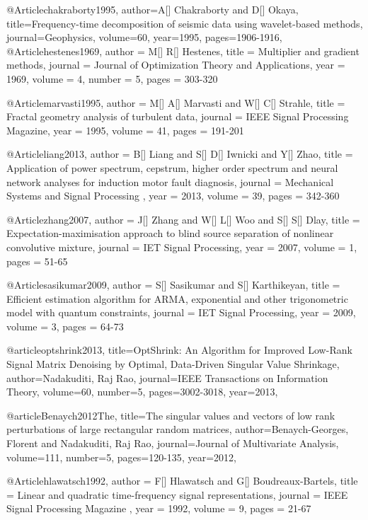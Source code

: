 @Article{chakraborty1995,
author={A[] Chakraborty and D[] Okaya},
title={Frequency-time decomposition of
seismic data using wavelet-based methods},
journal={Geophysics},
volume=60,
year=1995,
pages={1906-1916},
}
@Article{hestenes1969,
  author = 	 {M[] R[] Hestenes},
  title = 	 {Multiplier and gradient methods},
  journal = 	 {Journal of Optimization Theory and Applications},
  year = 	 1969,
  volume = 	 4,
  number = 5,
  pages = 	 {303-320}
}

@Article{marvasti1995,
  author = 	 {M[] A[] Marvasti and W[] C[] Strahle},
  title = 	 {Fractal geometry analysis of turbulent data},
  journal = 	 {IEEE Signal Processing Magazine},
  year = 	 1995,
  volume = 	 41,
  pages = 	 {191-201}
}

@Article{liang2013,
  author = 	 {B[] Liang and S[] D[] Iwnicki and Y[] Zhao},
  title = 	 {Application of power spectrum, cepstrum, higher order spectrum and neural network analyses for induction motor fault diagnosis},
  journal = 	 {Mechanical Systems and Signal Processing },
  year = 	 2013,
  volume = 39,
  pages = 	 {342-360}
}

@Article{zhang2007,
  author = 	 {J[] Zhang and W[] L[] Woo and S[] S[] Dlay},
  title = 	 {Expectation-maximisation approach to blind source separation of nonlinear convolutive mixture},
  journal = 	 {IET Signal Processing},
  year = 	 2007,
  volume = 1,
  pages = 	 {51-65}
}

@Article{sasikumar2009,
  author = 	 {S[] Sasikumar and S[] Karthikeyan},
  title = 	 {Efficient estimation algorithm for ARMA, exponential and other trigonometric model with quantum constraints},
  journal = 	 {IET Signal Processing},
  year = 	 2009,
  volume = 3,
  pages = 	 {64-73}
}






@article{optshrink2013,
  title={OptShrink: An Algorithm for Improved Low-Rank Signal Matrix Denoising by Optimal, Data-Driven Singular Value Shrinkage},
  author={Nadakuditi, Raj Rao},
  journal={IEEE Transactions on Information Theory},
  volume={60},
  number={5},
  pages={3002-3018},
  year={2013},
}

@article{Benaych2012The,
  title={The singular values and vectors of low rank perturbations of large rectangular random matrices},
  author={Benaych-Georges, Florent and Nadakuditi, Raj Rao},
  journal={Journal of Multivariate Analysis},
  volume={111},
  number={5},
  pages={120-135},
  year={2012},
}


@Article{hlawatsch1992,
  author = 	 {F[] Hlawatsch and G[] Boudreaux-Bartels},
  title = 	 { Linear and quadratic time-frequency signal representations},
  journal = 	 { IEEE Signal Processing Magazine },
  year = 	 1992,
  volume = 	 9,
  pages = 	 {21-67}
}


